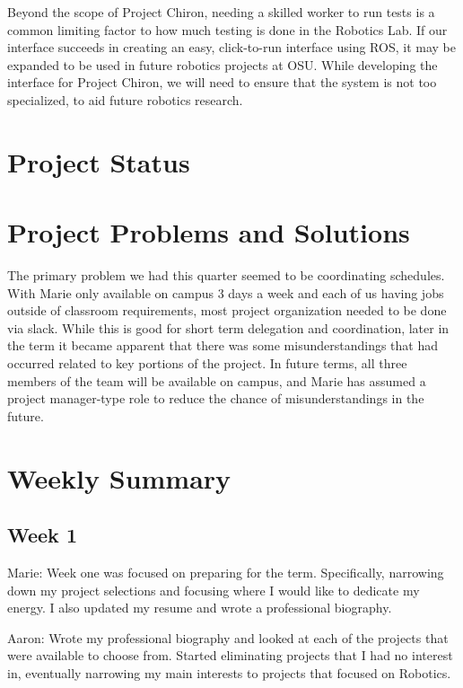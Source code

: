 \documentclass[onecolumn, draftclsnofoot,10pt, compsoc]{IEEEtran}
\begin{document}
Beyond the scope of Project Chiron, needing a skilled worker to run tests is a common limiting factor to how much testing is done in the Robotics Lab. If our interface succeeds in creating an easy, click-to-run interface using ROS, it may be expanded to be used in future robotics projects at OSU. While developing the interface for Project Chiron, we will need to ensure that the system is not too specialized, to aid future robotics research. 

\section{Project Status}

\section{Project Problems and Solutions}
The primary problem we had this quarter seemed to be coordinating schedules. With Marie only available on campus 3 days a week and each of us having jobs outside of classroom requirements, most project organization needed to be done via slack. While this is good for short term delegation and coordination, later in the term it became apparent that there was some misunderstandings that had occurred related to key portions of the project. In future terms, all three members of the team will be available on campus, and Marie has assumed a project manager-type role to reduce the chance of misunderstandings in the future. 

\section{Weekly Summary}

\subsection{Week 1}
Marie: Week one was focused on preparing for the term. Specifically, narrowing down my project selections and focusing where I would like to dedicate my energy. I also updated my resume and wrote a professional biography.\par

Aaron: Wrote my professional biography and looked at each of the projects that were available to choose from. Started eliminating projects that I had no interest in, eventually narrowing my main interests to projects that focused on Robotics.\par
\end{document}
